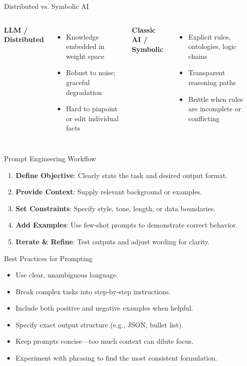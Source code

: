 \documentclass[german,10pt]{beamer}
\begin{document}
\begin{frame}{Distributed vs. Symbolic AI}
  \begin{columns}
      \textbf{LLM / Distributed}
      \begin{itemize}
        \item Knowledge embedded in weight space
        \item Robust to noise; graceful degradation
        \item Hard to pinpoint or edit individual facts
      \end{itemize}
      \textbf{Classic AI / Symbolic}
      \begin{itemize}
        \item Explicit rules, ontologies, logic chains
        \item Transparent reasoning paths
        \item Brittle when rules are incomplete or conflicting
      \end{itemize}
  \end{columns}
\end{frame}

\begin{frame}{Prompt Engineering Workflow}
  \begin{enumerate}
    \item \textbf{Define Objective}: Clearly state the task and desired output format.
    \item \textbf{Provide Context}: Supply relevant background or examples.
    \item \textbf{Set Constraints}: Specify style, tone, length, or data boundaries.
    \item \textbf{Add Examples}: Use few‑shot prompts to demonstrate correct behavior.
    \item \textbf{Iterate \& Refine}: Test outputs and adjust wording for clarity.
  \end{enumerate}
\end{frame}

\begin{frame}{Best Practices for Prompting}
  \begin{itemize}
    \item Use clear, unambiguous language.
    \item Break complex tasks into step‑by‑step instructions.
    \item Include both positive and negative examples when helpful.
    \item Specify exact output structure (e.g., JSON, bullet list).
    \item Keep prompts concise—too much context can dilute focus.
    \item Experiment with phrasing to find the most consistent formulation.
  \end{itemize}
\end{frame}
\end{document}
